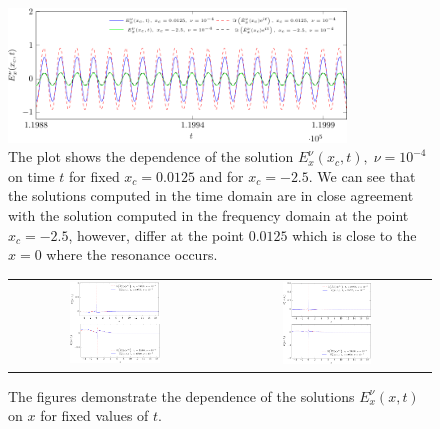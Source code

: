 \begin{figure}
 \includegraphics[width=0.8\textwidth]{pics_time_domain/res/ex_fixed_x_nu1e4-crop.pdf}
 \caption{The plot shows the dependence of the solution $E_x^{\nu}(x_c,t),\;\nu=10^{-4}$ on time $t$ for fixed 
 $x_c=0.0125$ and for $x_c=-2.5$. We can see that the solutions computed in the time domain are in close agreement 
 with the solution computed in the frequency domain at the point $x_c=-2.5$, however, differ at the point $0.0125$ which is 
 close to the $x=0$ where the resonance occurs.}
 \label{fig:resonance_nus_ex_x}
\end{figure}
\begin{figure}
\begin{tabular}{cc}
\includegraphics[width=0.45\textwidth]{pics_time_domain/res/ex_fixed_t-crop.pdf}&
\includegraphics[width=0.45\textwidth]{pics_time_domain/res/ex_fixed_t_1e3-crop.pdf}
\end{tabular}
\caption{The figures demonstrate the dependence of the solutions 
$E_x^{\nu}(x,t)$ on $x$ for fixed values of $t$. }
\label{fig:resonance_nus_ex_t}
\end{figure}
